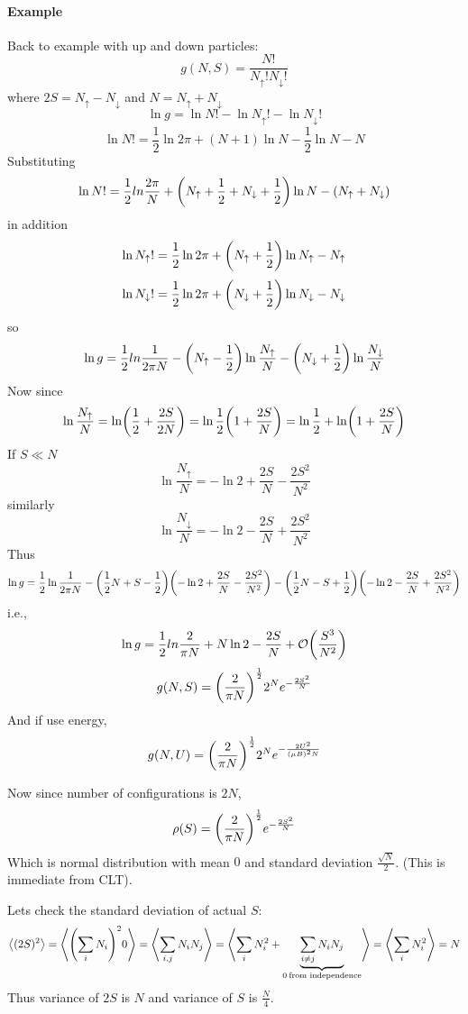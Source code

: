 \paragraph{Example}
Back to example with up and down particles:
$$g(N,S) = \frac{N!}{N_{\uparrow}!N_\downarrow!}$$
where $2S = N_\uparrow - N_\downarrow$ and $N= N_\uparrow + N_\downarrow$
$$\ln g = \ln N! - \ln N_\uparrow ! - \ln N_\downarrow!$$
$$\ln N! = \frac{1}{2} \ln 2\pi + (N+1) \ln N - \frac{1}{2} \ln N - N$$
Substituting
$$\ln N! = \frac{1}{2}ln \frac{2\pi}{N} + \qty(N_\uparrow + \frac{1}{2} + N_\downarrow + \frac{1}{2}) \ln N - (N_\uparrow + N_\downarrow)$$
in addition
$$\ln N_\uparrow! = \frac{1}{2} \ln 2\pi + \qty(N_\uparrow + \frac{1}{2}) \ln N_\uparrow - N_\uparrow$$
$$\ln N_\downarrow! = \frac{1}{2} \ln 2\pi + \qty(N_\downarrow + \frac{1}{2}) \ln N_\downarrow - N_\downarrow$$
so
$$\ln g = \frac{1}{2}ln \frac{1}{2\pi N}  - \qty(N_\uparrow - \frac{1}{2}) \ln \frac{N_\uparrow}{N}   - \qty(N_\downarrow + \frac{1}{2}) \ln \frac{N_\downarrow}{N} $$
Now since
$$\ln \frac{N_\uparrow}{N} = \ln(\frac{1}{2} + \frac{2S}{2N}) = \ln\frac{1}{2}\qty(1 + \frac{2S}{N}) = \ln \frac{1}{2} + \ln(1+\frac{2S}{N})$$
If $S \ll N$
$$\ln \frac{N_\uparrow}{N}  = -\ln 2 + \frac{2S}{N} - \frac{2S^2}{N^2}$$
similarly
$$\ln \frac{N_\downarrow}{N}  = -\ln 2 - \frac{2S}{N} + \frac{2S^2}{N^2}$$
Thus
$$\ln g = \frac{1}{2}\ln \frac{1}{2\pi N}  - \qty(\frac{1}{2}N + S - \frac{1}{2}) \qty(-\ln 2 + \frac{2S}{N} - \frac{2S^2}{N^2})  - \qty(\frac{1}{2}N - S + \frac{1}{2}) \qty(-\ln 2 - \frac{2S}{N} +  \frac{2S^2}{N^2}) $$
i.e.,
$$\ln g = \frac{1}{2}ln \frac{2}{\pi N}  + N \ln 2 -\frac{2S}{N} + \order{\frac{S^3}{N^2}}$$
$$g(N,S) = \qty(\frac{2}{\pi N})^{\frac{1}{2}} 2^N e^{-\frac{2S^2}{N}}$$
And if use energy,
$$g(N, U) = \qty(\frac{2}{\pi N})^{\frac{1}{2}} 2^N e^{-\frac{2U^2}{(\mu B)^2N}}$$

Now since number of configurations is $2N$, 
$$\rho(S) = \qty(\frac{2}{\pi N})^{\frac{1}{2}} e^{-\frac{2S^2}{N}} $$
Which is normal distribution with mean $0$ and standard deviation $\frac{\sqrt{N}}{2}$.  (This is immediate from CLT).

Lets check the standard deviation of actual $S$:
$$\big\langle (2S)^2 \big\rangle = \left\langle \qty(\sum_i N_i)^2
0 \right\rangle = \left\langle \sum_{i,j} N_iN_j \right\rangle = \left\langle \sum_i N_i^2 + \underbrace{\sum_{i\neq j} N_iN_j}_{0 \: \text{from independence}} \right\rangle  =\left\langle \sum_i N_i^2\right\rangle = N$$
Thus variance of $2S$ is $N$ and variance of $S$ is $\frac{N}{4}$.